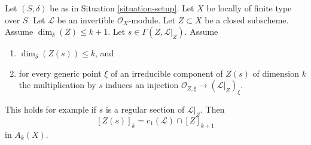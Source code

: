 \begin{lemma}
\label{lemma-geometric-cap}
Let $(S, \delta)$ be as in Situation \ref{situation-setup}.
Let $X$ be locally of finite type over $S$.
Let $\mathcal{L}$ be an invertible $\mathcal{O}_X$-module.
Let $Z \subset X$ be a closed subscheme.
Assume $\dim_\delta(Z) \leq k + 1$.
Let $s \in \Gamma(Z, \mathcal{L}|_Z)$.
Assume
\begin{enumerate}
\item $\dim_\delta(Z(s)) \leq k$, and
\item for every generic point $\xi$ of an irreducible component of
$Z(s)$ of dimension $k$ the multiplication by $s$
induces an injection $\mathcal{O}_{Z, \xi} \to (\mathcal{L}|_Z)_\xi$.
\end{enumerate}
This holds for example if $s$ is a regular section of $\mathcal{L}|_Z$.
Then
$$
[Z(s)]_k = c_1(\mathcal{L}) \cap [Z]_{k + 1}
$$
in $A_k(X)$.
\end{lemma}

